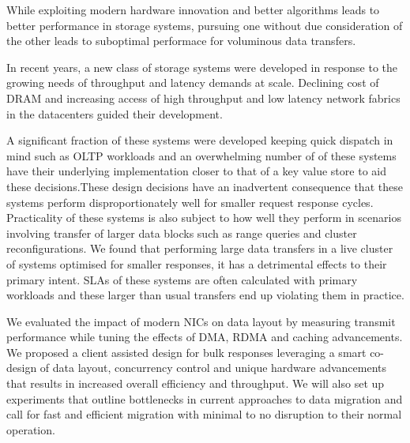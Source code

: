 

While exploiting modern hardware innovation and better algorithms leads to better performance 
in storage systems, pursuing one without due consideration of the other leads to
suboptimal performace for voluminous data transfers.


In recent years, a new class of storage systems were developed in response to the growing needs of throughput
and latency demands at scale. Declining cost of DRAM and increasing access of 
high throughput and low latency network fabrics in the datacenters guided their development.

A significant fraction of these systems were developed keeping quick dispatch in mind
such as OLTP workloads and an overwhelming number of of these systems have their underlying
implementation closer to that of a key value store to aid these decisions.These design 
decisions have an inadvertent consequence that these systems perform disproportionately
well for smaller request response cycles. Practicality of these systems is also subject to 
how well they perform in scenarios involving transfer of larger data blocks such as range queries 
and cluster reconfigurations. We found that performing large data transfers in a live cluster 
of systems optimised for smaller responses, it has a detrimental effects to their primary intent. 
SLAs of these systems are often calculated with primary workloads and these larger than usual transfers end 
up violating them in practice.

We evaluated the impact of modern NICs on data layout by measuring transmit performance
while tuning the effects of DMA, RDMA and caching advancements. We proposed a client assisted design
for bulk responses leveraging a smart co-design of data layout, concurrency control and
unique hardware advancements that results in increased overall efficiency and throughput.
We will also set up experiments that outline bottlenecks in current approaches to data migration
and call for fast and efficient migration with minimal to no disruption to their normal operation.
